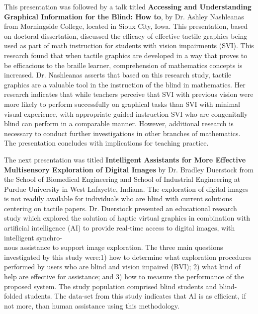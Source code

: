 \documentclass[11.5pt]{sig-alternate}
\begin{document}
\begin{large}
This presentation was followed by a talk titled \textbf{Accessing and Understanding Graphical Information for the Blind: How to}, by Dr. Ashley Nashleanas from Morningside College, located in Sioux City, Iowa. This presentation, based on doctoral dissertation, discussed the efficacy of effective tactile graphics being used as part of math instruction for students with vision impairments (SVI). This research found that when tactile graphics are developed in a way that proves to be efficacious to the braille learner, comprehension of mathematics concepts is increased. Dr. Nashleanas asserts that based on this research study, tactile graphics are a valuable tool in the instruction of the blind in mathematics. Her research indicates that while teachers perceive that SVI with previous vision were more likely to perform successfully on graphical tasks than SVI with minimal visual experience, with appropriate guided instruction SVI who are congenitally blind can perform in a comparable manner. However, additional research is necessary to conduct further investigations in other branches of mathematics. The presentation concludes with implications for teaching practice.

The next presentation was titled \textbf{Intelligent Assistants for More Effective Multisensory Exploration of Digital Images} by Dr. Bradley Duerstock from the School of Biomedical Engineering and School of Industrial Engineering at Purdue University in West Lafayette, Indiana. The exploration of digital images is not readily available for individuals who are blind with current solutions centering on tactile papers. Dr. Duerstock presented an educational research study which explored the solution of haptic virtual graphics in combination with artificial intelligence (AI) to provide real-time access to digital images, with intelligent synchro-\\nous assistance to support image exploration. The three main questions investigated by this study were:1) how to determine what exploration procedures performed by users who are blind and vision impaired (BVI); 2) what kind of help are effective for assistance; and 3) how to measure the performance of the proposed system. The study population comprised blind students and blind-folded students. The data-set from this study indicates that AI is as efficient, if not more, than human assistance using this methodology. 


\end{large}
\end{document}
